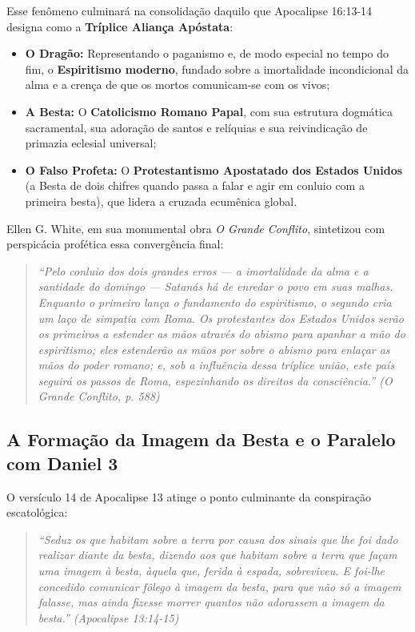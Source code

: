 Esse fenômeno culminará na consolidação daquilo que Apocalipse 16:13-14 designa como a \textbf{Tríplice Aliança Apóstata}:

\begin{itemize}
  \item \textbf{O Dragão:} Representando o paganismo e, de modo especial no tempo do fim, o \textbf{Espiritismo moderno}, fundado sobre a imortalidade incondicional da alma e a crença de que os mortos comunicam-se com os vivos;
  \item \textbf{A Besta:} O \textbf{Catolicismo Romano Papal}, com sua estrutura dogmática sacramental, sua adoração de santos e relíquias e sua reivindicação de primazia eclesial universal;
  \item \textbf{O Falso Profeta:} O \textbf{Protestantismo Apostatado dos Estados Unidos} (a Besta de dois chifres quando passa a falar e agir em conluio com a primeira besta), que lidera a cruzada ecumênica global.
\end{itemize}


Ellen G. White, em sua monumental obra \textit{O Grande Conflito}, sintetizou com perspicácia profética essa convergência final:


\begin{quote}
\itshape \textit{``Pelo conluio dos dois grandes erros — a imortalidade da alma e a santidade do domingo — Satanás há de enredar o povo em suas malhas. Enquanto o primeiro lança o fundamento do espiritismo, o segundo cria um laço de simpatia com Roma. Os protestantes dos Estados Unidos serão os primeiros a estender as mãos através do abismo para apanhar a mão do espiritismo; eles estenderão as mãos por sobre o abismo para enlaçar as mãos do poder romano; e, sob a influência dessa tríplice união, este país seguirá os passos de Roma, espezinhando os direitos da consciência.''} (\textit{O Grande Conflito}, p. 588)
\end{quote}




\subsection{A Formação da Imagem da Besta e o Paralelo com Daniel 3}


O versículo 14 de Apocalipse 13 atinge o ponto culminante da conspiração escatológica:


\begin{quote}
\itshape \textit{``Seduz os que habitam sobre a terra por causa dos sinais que lhe foi dado realizar diante da besta, dizendo aos que habitam sobre a terra que façam uma imagem à besta, àquela que, ferida à espada, sobreviveu. E foi-lhe concedido comunicar fôlego à imagem da besta, para que não só a imagem falasse, mas ainda fizesse morrer quantos não adorassem a imagem da besta.''} (Apocalipse 13:14-15)
\end{quote}


